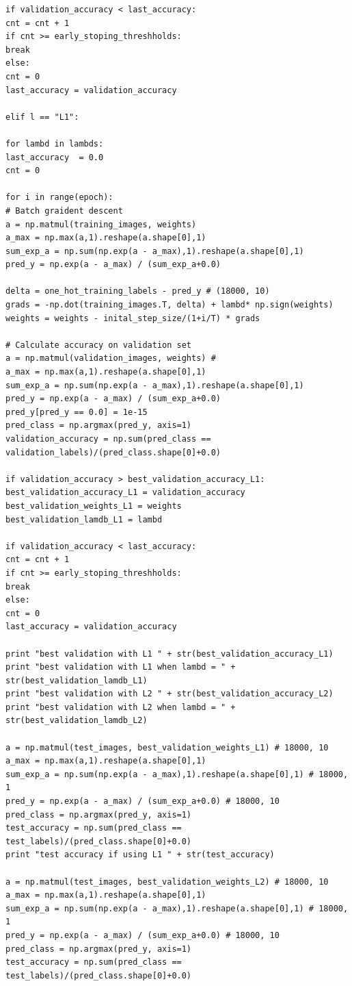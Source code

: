 \documentclass{article} %
\begin{document}
\begin{lstlisting}
if validation_accuracy < last_accuracy:
cnt = cnt + 1
if cnt >= early_stoping_threshholds:
break
else:
cnt = 0
last_accuracy = validation_accuracy

elif l == "L1":

for lambd in lambds:
last_accuracy  = 0.0
cnt = 0

for i in range(epoch):
# Batch graident descent
a = np.matmul(training_images, weights)
a_max = np.max(a,1).reshape(a.shape[0],1)
sum_exp_a = np.sum(np.exp(a - a_max),1).reshape(a.shape[0],1)  
pred_y = np.exp(a - a_max) / (sum_exp_a+0.0) 

delta = one_hot_training_labels - pred_y # (18000, 10)
grads = -np.dot(training_images.T, delta) + lambd* np.sign(weights)
weights = weights - inital_step_size/(1+i/T) * grads

# Calculate accuracy on validation set
a = np.matmul(validation_images, weights) #
a_max = np.max(a,1).reshape(a.shape[0],1)
sum_exp_a = np.sum(np.exp(a - a_max),1).reshape(a.shape[0],1)
pred_y = np.exp(a - a_max) / (sum_exp_a+0.0) 
pred_y[pred_y == 0.0] = 1e-15       
pred_class = np.argmax(pred_y, axis=1)
validation_accuracy = np.sum(pred_class == validation_labels)/(pred_class.shape[0]+0.0)

if validation_accuracy > best_validation_accuracy_L1:
best_validation_accuracy_L1 = validation_accuracy
best_validation_weights_L1 = weights
best_validation_lamdb_L1 = lambd

if validation_accuracy < last_accuracy:
cnt = cnt + 1
if cnt >= early_stoping_threshholds:
break
else:
cnt = 0
last_accuracy = validation_accuracy

print "best validation with L1 " + str(best_validation_accuracy_L1)
print "best validation with L1 when lambd = " + str(best_validation_lamdb_L1)
print "best validation with L2 " + str(best_validation_accuracy_L2)
print "best validation with L2 when lambd = " + str(best_validation_lamdb_L2)

a = np.matmul(test_images, best_validation_weights_L1) # 18000, 10
a_max = np.max(a,1).reshape(a.shape[0],1)
sum_exp_a = np.sum(np.exp(a - a_max),1).reshape(a.shape[0],1) # 18000, 1
pred_y = np.exp(a - a_max) / (sum_exp_a+0.0) # 18000, 10
pred_class = np.argmax(pred_y, axis=1)
test_accuracy = np.sum(pred_class == test_labels)/(pred_class.shape[0]+0.0)
print "test accuracy if using L1 " + str(test_accuracy) 

a = np.matmul(test_images, best_validation_weights_L2) # 18000, 10
a_max = np.max(a,1).reshape(a.shape[0],1)
sum_exp_a = np.sum(np.exp(a - a_max),1).reshape(a.shape[0],1) # 18000, 1
pred_y = np.exp(a - a_max) / (sum_exp_a+0.0) # 18000, 10
pred_class = np.argmax(pred_y, axis=1)
test_accuracy = np.sum(pred_class == test_labels)/(pred_class.shape[0]+0.0)


\end{lstlisting}
\end{document}
